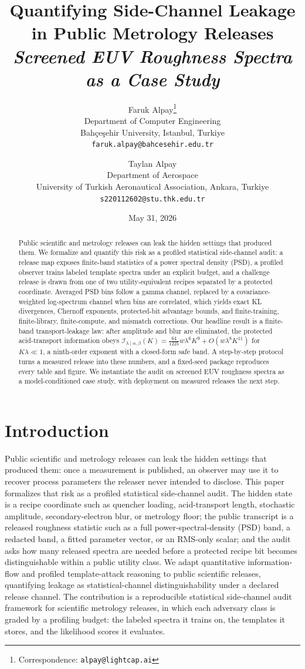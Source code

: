 \documentclass[11pt]{article}
\title{Quantifying Side-Channel Leakage in Public Metrology Releases\\[1.5ex]{\large\itshape Screened EUV Roughness Spectra as a Case Study}}
\author{
  Faruk Alpay\thanks{Correspondence: \texttt{alpay@lightcap.ai}}\\
  Department of Computer Engineering\\
  Bah\c{c}e\c{s}ehir University, Istanbul, Turkiye\\
  \texttt{faruk.alpay@bahcesehir.edu.tr}
  \and
  Taylan Alpay\\
  Department of Aerospace\\
  University of Turkish Aeronautical Association, Ankara, Turkiye\\
  \texttt{s220112602@stu.thk.edu.tr}
}
\date{May 31, 2026}
\begin{document}
\maketitle

\begin{abstract}
Public scientific and metrology releases can leak the hidden settings that produced them. We formalize and quantify this risk as a profiled statistical side-channel audit: a release map exposes finite-band statistics of a power spectral density (PSD), a profiled observer trains labeled template spectra under an explicit budget, and a challenge release is drawn from one of two utility-equivalent recipes separated by a protected coordinate. Averaged PSD bins follow a gamma channel, replaced by a covariance-weighted log-spectrum channel when bins are correlated, which yields exact KL divergences, Chernoff exponents, protected-bit advantage bounds, and finite-training, finite-library, finite-compute, and mismatch corrections. Our headline result is a finite-band transport-leakage law: after amplitude and blur are eliminated, the protected acid-transport information obeys \(\mathcal I_{\lambda\mid\alpha,\beta}(K)=\tfrac{64}{1225}w\lambda^6K^9+O(w\lambda^8K^{11})\) for \(K\lambda\ll1\), a ninth-order exponent with a closed-form safe band. A step-by-step protocol turns a measured release into these numbers, and a fixed-seed package reproduces every table and figure. We instantiate the audit on screened EUV roughness spectra as a model-conditioned case study, with deployment on measured releases the next step.
\end{abstract}

\section{Introduction}

Public scientific and metrology releases can leak the hidden settings that produced them: once a measurement is published, an observer may use it to recover process parameters the releaser never intended to disclose. This paper formalizes that risk as a profiled statistical side-channel audit. The hidden state is a recipe coordinate such as quencher loading, acid-transport length, stochastic amplitude, secondary-electron blur, or metrology floor; the public transcript is a released roughness statistic such as a full power-spectral-density (PSD) band, a redacted band, a fitted parameter vector, or an RMS-only scalar; and the audit asks how many released spectra are needed before a protected recipe bit becomes distinguishable within a public utility class. We adapt quantitative information-flow and profiled template-attack reasoning to public scientific releases, quantifying leakage as statistical-channel distinguishability under a declared release channel. The contribution is a reproducible statistical side-channel audit framework for scientific metrology releases, in which each adversary class is graded by a profiling budget: the labeled spectra it trains on, the templates it stores, and the likelihood scores it evaluates.
\end{document}
